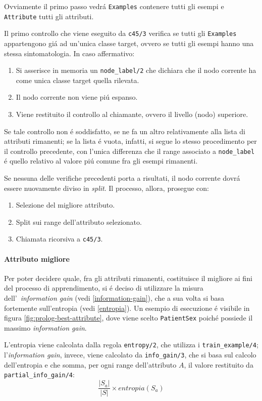 \documentclass[preprint]{acm_proc_article-sp}
\begin{document}
Ovviamente il primo passo vedr\'a \verb|Examples| contenere tutti gli esempi e \verb|Attribute| tutti gli attributi.

Il primo controllo che viene eseguito da \verb|c45/3| verifica se tutti gli \verb|Examples| appartengono gi\'a ad un'unica classe target, ovvero se tutti gli esempi hanno una stessa sintomatologia. In caso affermativo:
\begin{enumerate}
\item Si asserisce in memoria un \verb|node_label/2| che dichiara che il nodo corrente ha come unica classe target quella rilevata.
\item Il nodo corrente non viene pi\'u espanso.
\item Viene restituito il controllo al chiamante, ovvero il livello (nodo) superiore.
\end{enumerate}

Se tale controllo non \'e soddisfatto, se ne fa un altro relativamente alla lista di attributi rimanenti; se la lista \'e vuota, infatti, si segue lo stesso procedimento per il controllo precedente, con l'unica differenza che il range associato a \verb|node_label| \'e quello relativo al valore pi\'u comune fra gli esempi rimanenti.

Se nessuna delle verifiche precedenti porta a risultati, il nodo corrente dovr\'a essere nuovamente diviso in \textit{split}. Il processo, allora, prosegue con:
\begin{enumerate}
\item Selezione del migliore attributo.
\item Split sui range dell'attributo selezionato.
\item Chiamata ricorsiva a \verb|c45/3|.
\end{enumerate}

\paragraph{Attributo migliore}
\label{apprendimento-attributo-migliore}
Per poter decidere quale, fra gli attributi rimanenti, costituisce il migliore ai fini del processo di apprendimento, si \'e deciso di utilizzare la misura dell'~\textit{information gain} (vedi \ref{information-gain}), che a sua volta si basa fortemente sull'entropia (vedi \ref{entropia}). Un esempio di esecuzione \'e visibile in figura \ref{fig:prolog-best-attribute}, dove viene scelto \verb|PatientSex| poich\'e possiede il massimo \textit{information gain}.

L'entropia viene calcolata dalla regola \verb|entropy/2|, che utilizza i \verb|train_example/4|; l'\textit{information gain}, invece, viene calcolato da \verb|info_gain/3|, che si basa sul calcolo dell'entropia e che somma, per ogni range dell'attributo $A$, il valore restituito da \verb|partial_info_gain/4|:
\[\frac{|S_a|}{|S|} \times entropia(S_a)\]
\end{document}
